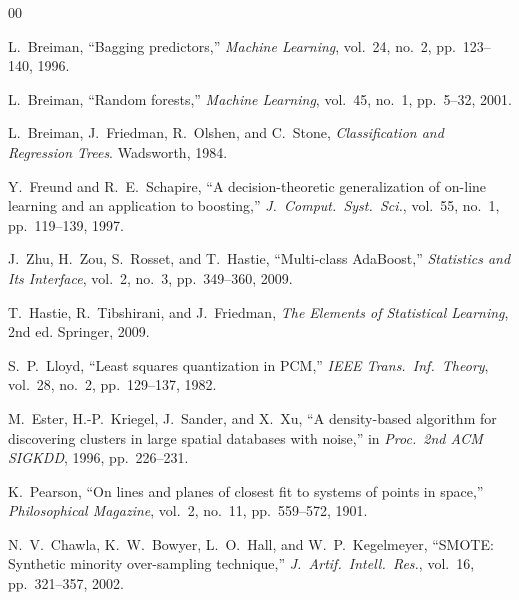 \documentclass[conference]{IEEEtran}
\begin{document}

\begin{thebibliography}{00}

L.~Breiman, ``Bagging predictors,'' \textit{Machine Learning}, vol.~24, no.~2,
pp.~123--140, 1996.

L.~Breiman, ``Random forests,'' \textit{Machine Learning}, vol.~45, no.~1,
pp.~5--32, 2001.

L.~Breiman, J.~Friedman, R.~Olshen, and C.~Stone, \textit{Classification and
Regression Trees}. Wadsworth, 1984.

Y.~Freund and R.~E.~Schapire, ``A decision-theoretic generalization of
on-line learning and an application to boosting,'' \textit{J.\ Comput.\
Syst.\ Sci.}, vol.~55, no.~1, pp.~119--139, 1997.

J.~Zhu, H.~Zou, S.~Rosset, and T.~Hastie, ``Multi-class AdaBoost,''
\textit{Statistics and Its Interface}, vol.~2, no.~3, pp.~349--360, 2009.

T.~Hastie, R.~Tibshirani, and J.~Friedman, \textit{The Elements of Statistical
Learning}, 2nd ed. Springer, 2009.

S.~P.~Lloyd, ``Least squares quantization in PCM,'' \textit{IEEE Trans.\ Inf.\
Theory}, vol.~28, no.~2, pp.~129--137, 1982.

M.~Ester, H.-P.~Kriegel, J.~Sander, and X.~Xu, ``A density-based algorithm
for discovering clusters in large spatial databases with noise,'' in
\textit{Proc.\ 2nd ACM SIGKDD}, 1996, pp.~226--231.

K.~Pearson, ``On lines and planes of closest fit to systems of points in
space,'' \textit{Philosophical Magazine}, vol.~2, no.~11, pp.~559--572, 1901.

\bibitem{chawla2002smote}
N.~V.~Chawla, K.~W.~Bowyer, L.~O.~Hall, and W.~P.~Kegelmeyer, ``SMOTE:
Synthetic minority over-sampling technique,'' \textit{J.\ Artif.\ Intell.\
Res.}, vol.~16, pp.~321--357, 2002.

\end{thebibliography}
\end{document}
